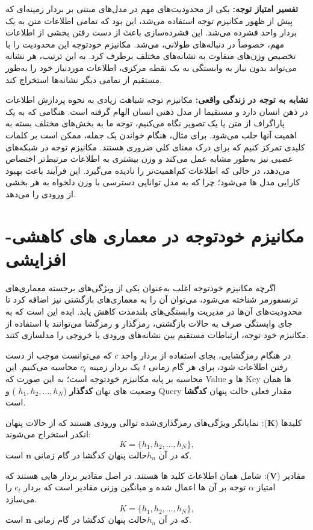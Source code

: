 \textbf{تفسیر امتیاز توجه:}  
یکی از محدودیت‌های مهم در مدل‌های مبتنی بر بردار زمینه‌ای که پیش از ظهور مکانیزم توجه استفاده می‌شد، این بود که تمامی اطلاعات متن به یک بردار واحد فشرده می‌شد. این فشرده‌سازی باعث از دست رفتن بخشی از اطلاعات مهم، خصوصاً در دنباله‌های طولانی، می‌شد. مکانیزم خودتوجه این محدودیت را با تخصیص وزن‌های متفاوت به نشانه‌های مختلف برطرف کرد. به این ترتیب، هر نشانه می‌تواند  بدون نیاز به وابستگی به یک نقطه مرکزی، اطلاعات موردنیاز خود را به‌طور مستقیم از تمامی دیگر نشانه‌ها استخراج کند‍.

\textbf{تشابه به توجه در زندگی واقعی:}  
مکانیزم توجه شباهت زیادی به نحوه پردازش اطلاعات در ذهن انسان دارد و مستقیما از مدل ذهنی انسان الهام گرفته است. هنگامی که به یک پاراگراف از متن یا یک تصویر نگاه می‌کنیم، توجه ما به بخش‌های مختلف بسته به اهمیت آنها جلب می‌شود. برای مثال، هنگام خواندن یک جمله، ممکن است بر کلمات کلیدی تمرکز کنیم که برای درک معنای کلی ضروری هستند. مکانیزم توجه در شبکه‌های عصبی نیز به‌طور مشابه عمل می‌کند و وزن بیشتری به اطلاعات مرتبط‌تر اختصاص می‌دهد، در حالی که اطلاعات کم‌اهمیت‌تر را نادیده می‌گیرد. این فرآیند باعث بهبود کارایی مدل ها می‌شود؛ چرا که به مدل توانایی دسترسی با وزن دلخواه به هر بخشی از ورودی را می‌دهد.

\section{مکانیزم خودتوجه در معماری های کاهشی-افزایشی}
اگرچه مکانیزم خودتوجه اغلب به‌عنوان یکی از ویژگی‌های برجسته معماری‌های ترنسفورمر شناخته می‌شود، می‌توان آن را به معماری‌های بازگشتی نیز اضافه کرد تا محدودیت‌های آن‌ها در مدیریت وابستگی‌های بلندمدت کاهش یابد. ایده این است که به جای وابستگی صرف به حالات بازگشتی، رمزگذار و رمزگشا می‌توانند با استفاده از مکانیزم خود-توجه، ارتباطات مستقیم بین نشانه‌های ورودی یا خروجی را مدلسازی کنند.

در هنگام رمزگشایی‌، بجای استفاده از بردار واحد $c$ که می‌توانست موجب از دست رفتن اطلاعات شود،‌ برای هر گام زمانی $t$ یک بردار زمینه $c_t$ محاسبه می‌کنیم. این محاسبه بر پایه مکانیزم خودتوجه است؛ به این صورت که Value ها و Key ها همان وضعیت های نهان  \textbf{کدگذار} (${h_1, h_2, \dots, h_N}$ ) و Query مقدار فعلی حالت پنهان \textbf{کدگشا} است.  

کلیدها ($\mathbf{K}$): نمایانگر ویژگی‌های رمزگذاری‌شده توالی ورودی هستند که از حالات پنهان انکدر استخراج می‌شوند: 
$$
K = \{h_1, h_2, \dots, h_N\},
$$
که در آن $ h_n $​ حالت پنهان کدگشا در گام زمانی $\mathbf{n}$ است.

مقادیر ($\mathbf{V}$): شامل همان اطلاعات کلید ها هستند. در اصل مقادیر بردار هایی هستند که امتیاز $\alpha$ توجه بر آن ها اعمال شده و میانگین وزنی مقادیر است که بردار $c_t$ را می‌سازد.
$$
K = \{h_1, h_2, \dots, h_N\},
$$
که در آن $ h_n $​ حالت پنهان کدگشا در گام زمانی $\mathbf{n}$ است.


